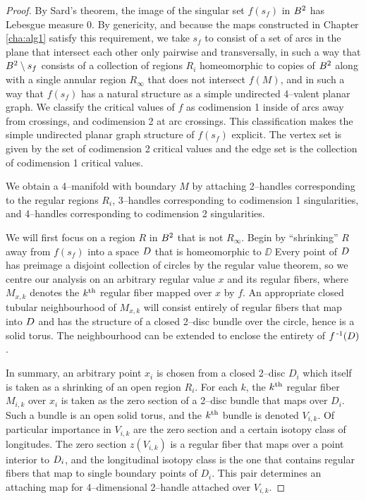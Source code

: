 \begin{proof}
	By Sard's theorem, the image of the singular set $f(s_f)$ in $B^2$ has Lebesgue measure 0.
	By genericity, and because the maps constructed in Chapter \ref{cha:alg1} satisfy this requirement, we take $s_f$ to consist of a set of arcs in the plane that intersect each other only pairwise and transversally, in such a way that $B^2\setminus s_f$ consists of a collection of regions $R_i$ homeomorphic to copies of $B^2$ along with a single annular region $R_\infty$ that does not intersect $f(M)$, and in such a way that $f(s_f)$ has a natural structure as a simple undirected 4--valent planar graph.
	We classify the critical values of $f$ as codimension 1 inside of arcs away from crossings, and codimension 2 at arc crossings.
	This classification makes the simple undirected planar graph structure of $f(s_f)$ explicit.
	The vertex set is given by the set of codimension 2 critical values and the edge set is the collection of codimension 1 critical values.
	
	We obtain a 4--manifold with boundary $M$ by attaching 2--handles corresponding to the regular regions $R_i$, 3--handles corresponding to codimension 1 singularities, and 4--handles corresponding to codimension 2 singularities.
	
	We will first focus on a region $R$ in $B^2$ that is not $R_\infty$.
	Begin by ``shrinking'' $R$ away from $f(s_f)$ into a space $D$ that is homeomorphic to $\DD$
	Every point of $D$ has preimage a disjoint collection of circles by the regular value theorem, so we centre our analysis on an arbitrary regular value $x$ and its regular fibers, where $M_{x,k}$ denotes the $k^{\text{th}}$ regular fiber mapped over $x$ by $f$.
	An appropriate closed tubular neighbourhood of $M_{x,k}$ will consist entirely of regular fibers that map into $D$ and has the structure of a closed 2--disc bundle over the circle, hence is a solid torus.
	The neighbourhood can be extended to enclose the entirety of $f^{\,\text{-}1}(D)$.
	
	In summary, an arbitrary point $x_i$ is chosen from a closed 2--disc $D_i$ which itself is taken as a shrinking of an open region $R_i$.
	For each $k$, the $k^{\text{th}}$ regular fiber $M_{i,k}$ over $x_i$ is taken as the zero section of a 2--disc bundle that maps over $D_i$.
	Such a bundle is an open solid torus, and the $k^{\text{th}}$ bundle is denoted $V_{i,k}$.
	Of particular importance in $V_{i,k}$ are the zero section and a certain isotopy class of longitudes.
	The zero section $z(V_{i,k})$ is a regular fiber that maps over a point interior to $D_i$, and the longitudinal isotopy class is the one that contains regular fibers that map to single boundary points of $D_i$.
	This pair determines an attaching map for 4--dimensional 2--handle attached over $V_{i,k}$.
	

\end{proof}
